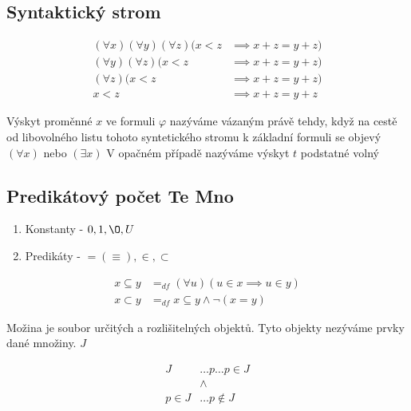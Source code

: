   \subsection*{Syntaktický strom}
  \begin{align*}
    (\forall x)(\forall y)(\forall z)(x<z  &\implies x+z=y+z)
    \\(\forall y)(\forall z)(x<z  &\implies x+z=y+z)
    \\(\forall z)(x<z  &\implies x+z=y+z)
    \\x<z  &\implies x+z=y+z
\end{align*}

\begin{description}
    \item Výskyt proměnné $x$ ve formuli $\varphi$ nazýváme vázaným právě tehdy, když na cestě od libovolného listu tohoto syntetického stromu k základní formuli se objevý $(\forall x)$ nebo $(\exists x)$ V opačném případě nazýváme výskyt $t$ podstatné volný
\end{description}

\subsection*{Predikátový počet Te Mno}
\begin{enumerate}
    \item Konstanty - $0,1, \O, U$
    \item Predikáty - $= (\equiv), \in, \subset$
\end{enumerate}
\begin{align*}
    x \subseteq y &=_{df} (\forall u ) (u \in x \implies u \in y)
    \\x \subset y &=_{df} x \subseteq y \land \neg(x=y)
\end{align*}
\begin{description}
    \item Možina je soubor určitých a rozlišitelných objektů. Tyto objekty nezýváme prvky dané množiny. $J$
\end{description}
\begin{align*}
    J &\dots p \dots p \in J \\
     &\land \\
     p \in J &\dots p \notin J
\end{align*}
